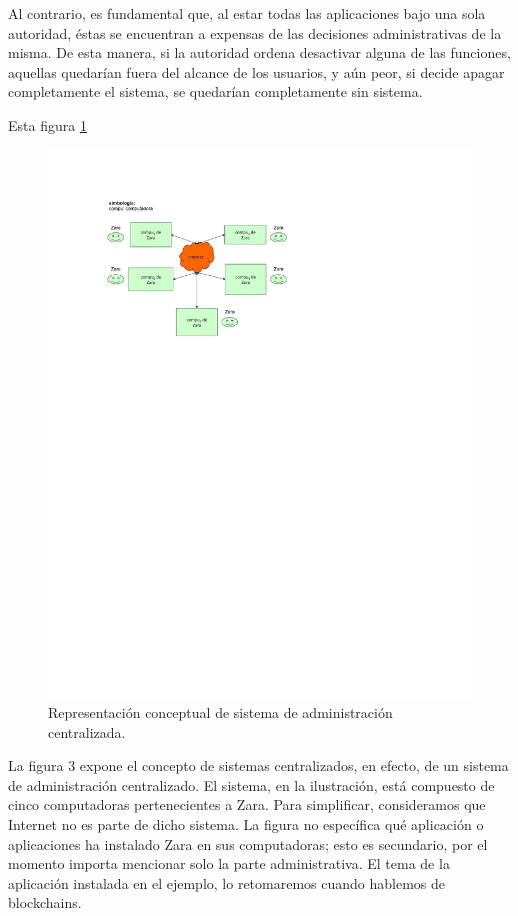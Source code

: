 \documentclass[12pt]{report} %
\begin{document}
\begin{itemize}
Al contrario, es fundamental que, al estar todas las aplicaciones bajo una sola autoridad, éstas se encuentran a expensas de las decisiones administrativas de la misma. De esta manera, si la autoridad ordena desactivar alguna de las funciones, aquellas quedarían fuera del alcance de los usuarios, y aún peor, si decide apagar completamente el sistema, se quedarían completamente sin sistema. 


Esta figura \ref{imagendesc3}

\begin{figure}
\centering
\includegraphics[width=0.85\columnwidth]{imagenes/imagendesc3.pdf}
\caption{Representación conceptual de sistema de administración centralizada.}
\label{imagendesc3}
\end{figure} 

La figura 3 expone el concepto de sistemas centralizados, en efecto, de un sistema de administración centralizado. El sistema, en la ilustración, está compuesto de cinco computadoras pertenecientes a Zara. Para simplificar, consideramos que Internet no es parte de dicho sistema. La figura no específica qué aplicación o aplicaciones ha instalado Zara en sus computadoras; esto es secundario, por el momento importa mencionar solo la parte administrativa. El tema de la aplicación instalada en el ejemplo, lo retomaremos cuando hablemos de blockchains.


\end{itemize}
\end{document}
